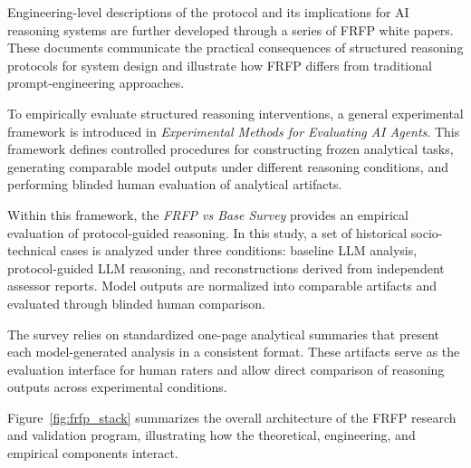Engineering-level descriptions of the protocol and its implications for AI reasoning systems are further developed through a series of FRFP white papers. These documents communicate the practical consequences of structured reasoning protocols for system design and illustrate how FRFP differs from traditional prompt-engineering approaches.

To empirically evaluate structured reasoning interventions, a general experimental framework is introduced in \emph{Experimental Methods for Evaluating AI Agents}. This framework defines controlled procedures for constructing frozen analytical tasks, generating comparable model outputs under different reasoning conditions, and performing blinded human evaluation of analytical artifacts.

Within this framework, the \emph{FRFP vs Base Survey} provides an empirical evaluation of protocol-guided reasoning. In this study, a set of historical socio-technical cases is analyzed under three conditions: baseline LLM analysis, protocol-guided LLM reasoning, and reconstructions derived from independent assessor reports. Model outputs are normalized into comparable artifacts and evaluated through blinded human comparison.

The survey relies on standardized one-page analytical summaries that present each model-generated analysis in a consistent format. These artifacts serve as the evaluation interface for human raters and allow direct comparison of reasoning outputs across experimental conditions.

Figure~\ref{fig:frfp_stack} summarizes the overall architecture of the FRFP research and validation program, illustrating how the theoretical, engineering, and empirical components interact.


